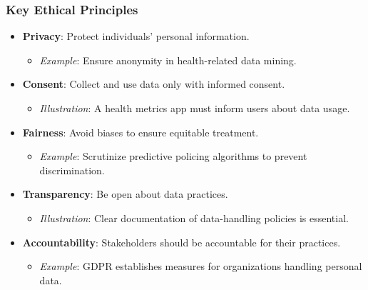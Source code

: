 \documentclass[aspectratio=169]{beamer}
\begin{document}
\begin{frame}[fragile]
    \frametitle{Key Ethical Principles}
    \begin{itemize}
        \item \textbf{Privacy}: Protect individuals' personal information.
        \begin{itemize}
            \item \emph{Example}: Ensure anonymity in health-related data mining.
        \end{itemize}

        \item \textbf{Consent}: Collect and use data only with informed consent.
        \begin{itemize}
            \item \emph{Illustration}: A health metrics app must inform users about data usage.
        \end{itemize}
        
        \item \textbf{Fairness}: Avoid biases to ensure equitable treatment.
        \begin{itemize}
            \item \emph{Example}: Scrutinize predictive policing algorithms to prevent discrimination.
        \end{itemize}
        
        \item \textbf{Transparency}: Be open about data practices.
        \begin{itemize}
            \item \emph{Illustration}: Clear documentation of data-handling policies is essential.
        \end{itemize}

        \item \textbf{Accountability}: Stakeholders should be accountable for their practices.
        \begin{itemize}
            \item \emph{Example}: GDPR establishes measures for organizations handling personal data.
        \end{itemize}
    \end{itemize}
\end{frame}
\end{document}
